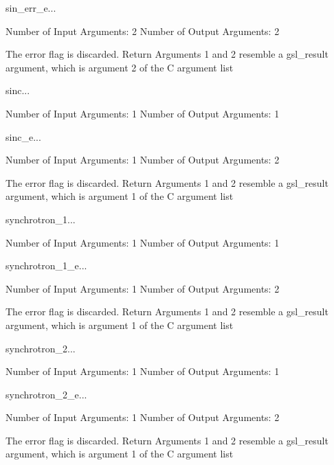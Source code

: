 \begin{funcdesc}{sin_err_e}{...}

    Number of Input  Arguments:  2
    Number of Output Arguments:  2

The error flag is discarded.
Return Arguments 1 and 2 resemble a gsl_result argument,
	which is  argument 2 of the C argument list

\end{funcdesc}

\begin{funcdesc}{sinc}{...}

    Number of Input  Arguments:  1
    Number of Output Arguments:  1
\end{funcdesc}

\begin{funcdesc}{sinc_e}{...}

    Number of Input  Arguments:  1
    Number of Output Arguments:  2

The error flag is discarded.
Return Arguments 1 and 2 resemble a gsl_result argument,
	which is  argument 1 of the C argument list

\end{funcdesc}

\begin{funcdesc}{synchrotron_1}{...}

    Number of Input  Arguments:  1
    Number of Output Arguments:  1
\end{funcdesc}

\begin{funcdesc}{synchrotron_1_e}{...}

    Number of Input  Arguments:  1
    Number of Output Arguments:  2

The error flag is discarded.
Return Arguments 1 and 2 resemble a gsl_result argument,
	which is  argument 1 of the C argument list

\end{funcdesc}

\begin{funcdesc}{synchrotron_2}{...}

    Number of Input  Arguments:  1
    Number of Output Arguments:  1
\end{funcdesc}

\begin{funcdesc}{synchrotron_2_e}{...}

    Number of Input  Arguments:  1
    Number of Output Arguments:  2

The error flag is discarded.
Return Arguments 1 and 2 resemble a gsl_result argument,
	which is  argument 1 of the C argument list

\end{funcdesc}

